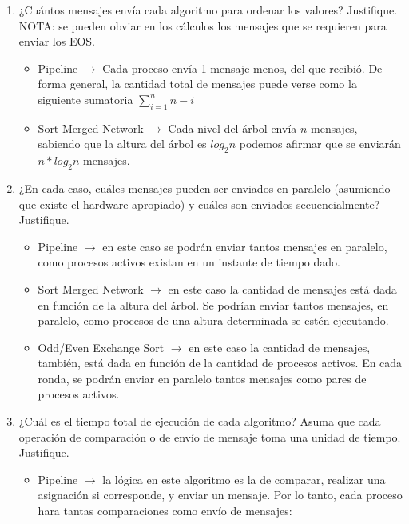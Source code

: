 \documentclass[a4paper, 10pt]{article}
\newenvironment{QandA}{
    \begin{enumerate}\bfseries}
    {\end{enumerate}
}
\newenvironment{answered}{\par\normalfont}{}
\begin{document}
\begin{QandA}
\begin{enumerate}
\item ¿Cuántos mensajes envía cada algoritmo para ordenar los valores? Justifique. NOTA: se pueden obviar en los cálculos los mensajes que se requieren para enviar los EOS.
\begin{answered}
\begin{itemize}
    \item Pipeline $\rightarrow$ Cada proceso envía 1 mensaje menos, del que recibió. De forma general, la cantidad total de mensajes puede verse como la siguiente sumatoria $\sum_{i=1}^n n-i$
    \item Sort Merged Network $\rightarrow$ Cada nivel del árbol envía $n$ mensajes, sabiendo que la altura del árbol es $log_2 n$ podemos afirmar que se enviarán $n * log_2 n$ mensajes.
\end{itemize}
\end{answered}
\item ¿En cada caso, cuáles mensajes pueden ser enviados en paralelo (asumiendo que existe el hardware apropiado) y cuáles son enviados secuencialmente? Justifique.
\begin{answered}
\begin{itemize}
    \item Pipeline $\rightarrow$ en este caso se podrán enviar tantos mensajes en paralelo, como procesos activos existan en un instante de tiempo dado.
    \item Sort Merged Network $\rightarrow$ en este caso la cantidad de mensajes está dada en función de la altura del árbol. Se podrían enviar tantos mensajes, en paralelo, como procesos de una altura determinada se estén ejecutando.
    \item Odd/Even Exchange Sort $\rightarrow$ en este caso la cantidad de mensajes, también, está dada en función de la cantidad de procesos activos. En cada ronda, se podrán enviar en paralelo tantos mensajes como pares de procesos activos.
\end{itemize}
\end{answered}
\item ¿Cuál es el tiempo total de ejecución de cada algoritmo? Asuma que cada operación de comparación o de envío de mensaje toma una unidad de tiempo. Justifique.
\begin{answered}
\begin{itemize}
\item Pipeline $\rightarrow$ la lógica en este algoritmo es la de comparar, realizar una asignación si corresponde, y enviar un mensaje. Por lo tanto, cada proceso hara tantas comparaciones como envío de mensajes:

\end{itemize}
\end{answered}
\end{enumerate}
\end{QandA}
\end{document}
